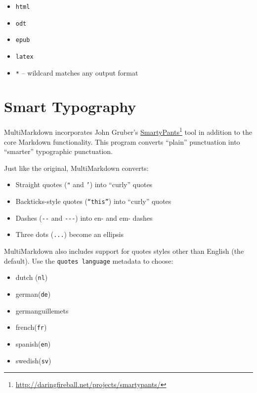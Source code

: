 \begin{itemize}
\item \texttt{html}

\item \texttt{odt}

\item \texttt{epub}

\item \texttt{latex}

\item \texttt{*} -- wildcard matches any output format

\end{itemize}

\section{Smart Typography }
\label{smarttypography}

MultiMarkdown incorporates John Gruber's \href{http://daringfireball.net/projects/smartypants/}{SmartyPants}\footnote{\href{http://daringfireball.net/projects/smartypants/}{http:\slash \slash daringfireball.net\slash projects\slash smartypants\slash }} tool in addition to the core Markdown functionality. This program converts ``plain'' punctuation into ``smarter'' typographic punctuation.

Just like the original, MultiMarkdown converts:

\begin{itemize}
\item Straight quotes (\texttt{"} and \texttt{'}) into ``curly'' quotes

\item Backticks-style quotes (\texttt{``this''}) into ``curly'' quotes

\item Dashes (\texttt{-{}-} and \texttt{-{}-{}-}) into en- and em- dashes

\item Three dots (\texttt{...}) become an ellipsis

\end{itemize}

MultiMarkdown also includes support for quotes styles other than English (the default). Use the \texttt{quotes language} metadata to choose:

\begin{itemize}
\item dutch (\texttt{nl})

\item german(\texttt{de})

\item germanguillemets

\item french(\texttt{fr})

\item spanish(\texttt{en})

\item swedish(\texttt{sv})

\end{itemize}

